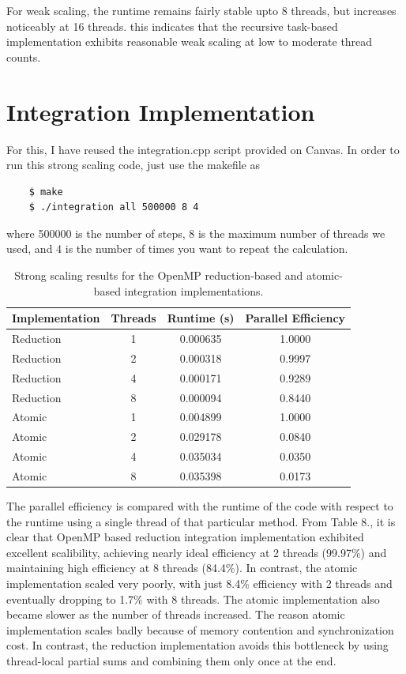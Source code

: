 \documentclass{article}[12pt]
\begin{document}
For weak scaling, the runtime remains fairly stable upto 8 threads, but increases noticeably at 16 threads. this indicates that the recursive task-based implementation exhibits reasonable weak scaling at low to moderate thread counts.

\section{Integration Implementation}

For this, I have reused the integration.cpp script provided on Canvas. In order to run this strong scaling code, just use the makefile as 

\begin{verbatim}
    $ make
    $ ./integration all 500000 8 4
\end{verbatim}

where 500000 is the number of steps, 8 is the maximum number of threads we used, and 4 is the number of times you want to repeat the calculation. 
\begin{table}[h!]
\centering
\begin{tabular}{lccc}
\hline
Implementation & Threads & Runtime (s) & Parallel Efficiency \\
\hline
Reduction & 1 & 0.000635 & 1.0000 \\
Reduction & 2 & 0.000318 & 0.9997 \\
Reduction & 4 & 0.000171 & 0.9289 \\
Reduction & 8 & 0.000094 & 0.8440 \\
\hline
Atomic & 1 & 0.004899 & 1.0000 \\
Atomic & 2 & 0.029178 & 0.0840 \\
Atomic & 4 & 0.035034 & 0.0350 \\
Atomic & 8 & 0.035398 & 0.0173 \\
\hline
\end{tabular}
\caption{Strong scaling results for the OpenMP reduction-based and atomic-based integration implementations.}
\label{tab:integration_scaling}
\end{table}

The parallel efficiency is compared with the runtime of the code with respect to the runtime using a single thread of that particular method. From Table 8., it is clear that OpenMP based reduction integration implementation exhibited excellent scalibility, achieving nearly ideal efficiency at 2 threads (99.97\%) and maintaining high efficiency at 8 threads (84.4\%). In contrast, the atomic implementation scaled very poorly, with just 8.4\% efficiency with 2 threads and eventually dropping to 1.7\% with 8 threads. The atomic implementation also became slower as the number of threads increased. The reason atomic implementation scales badly because of memory contention and synchronization cost. In contrast, the reduction implementation avoids this bottleneck by using thread-local partial sums and combining them only once at the end.
\end{document}
